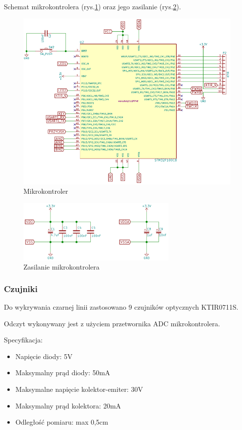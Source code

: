 \documentclass[12pt,a4paper]{article}
\begin{document}
Schemat mikrokontrolera (rys.\ref{fig:uc}) oraz jego zasilanie (rys.\ref{fig:uc_sup}).
\begin{figure}[tp]
\centering
\includegraphics[width=1\textwidth]{figures/uc.png}
\caption{Mikrokontroler \label{fig:uc}}
\end{figure}
\begin{figure}[tp]
\centering
\includegraphics[width=0.7\textwidth]{figures/uc_sup.png}
\caption{Zasilanie mikrokontrolera \label{fig:uc_sup}}
\end{figure}


\subsubsection{Czujniki}
Do wykrywania czarnej linii zastosowano 9 czujników optycznych KTIR0711S.

Odczyt wykonywany jest z użyciem przetwornika ADC mikrokontrolera.

Specyfikacja:
\begin{itemize}
\item Napięcie diody: 5V
\item Maksymalny prąd diody: 50mA
\item Maksymalne napięcie kolektor-emiter: 30V
\item Maksymalny prąd kolektora: 20mA
\item Odległość pomiaru: max 0,5cm
\end{itemize}
\end{document}
